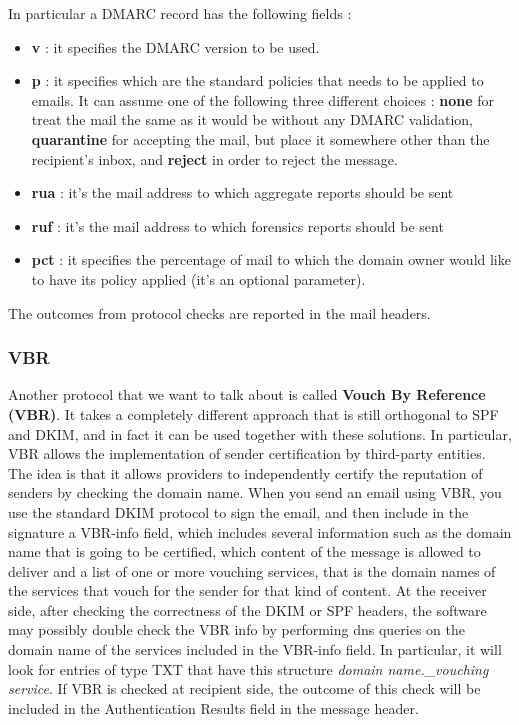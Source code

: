 In particular a DMARC record has the following fields :
\begin{itemize}
\item \textbf{v} : it specifies the DMARC version to be used.
\item \textbf{p} : it specifies which are the standard policies that needs to be applied to emails. It can assume one of the following three different choices : \textbf{none} for treat the mail the same as it would be without any DMARC validation, \textbf{quarantine} for accepting the mail, but place it somewhere other than the recipient's inbox, and \textbf{reject} in order to reject the message.
\item \textbf{rua} : it's the mail address to which aggregate reports should be sent
\item \textbf{ruf} : it's the mail address to which forensics reports should be sent
\item \textbf{pct} : it specifies the percentage of mail to which the domain owner would like to have its policy applied (it's an optional parameter).
\end{itemize}
The outcomes from protocol checks are reported in the mail headers.

\subsubsection{VBR}
Another protocol that we want to talk about is called \textbf{Vouch By Reference (VBR)}. It takes a completely different approach that is still orthogonal to SPF and DKIM, and in fact it can be used together with these solutions. In particular, VBR allows the implementation of sender certification by third-party entities. The idea is that it allows providers to independently certify the reputation of senders by checking the domain name. When you send an email using VBR, you use the standard DKIM protocol to sign the email, and then include in the signature a VBR-info field, which includes several information such as the domain name that is going to be certified, which content of the message is allowed to deliver and a list of one or more vouching services, that is the domain names of the services that vouch for the sender for that kind of content. At the receiver side, after checking the correctness of the DKIM or SPF headers, the software may possibly double check the VBR info by performing dns queries on the domain name of the services included in the VBR-info field. In particular, it will look for entries of type TXT that have this structure \textit{domain name.\_vouching service}. If VBR is checked at recipient side, the outcome of this check will be included in the Authentication Results field in the message header.

